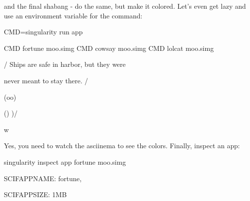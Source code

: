 \documentclass[letterpaper,10pt,english]{sphinxmanual}
\begin{document}
and the final shabang - do the same, but make it colored. Let’s even get
lazy and use an environment variable for the command:

%
\begin{sphinxVerbatim}[commandchars=\\\{\}]
CMD=\PYGZdq{}singularity run \PYGZhy{}\PYGZhy{}app\PYGZdq{}

\PYGZdl{}CMD fortune moo.simg \textbar{} \PYGZdl{}CMD cowsay moo.simg \textbar{} \PYGZdl{}CMD lolcat moo.simg

 \PYGZus{}\PYGZus{}\PYGZus{}\PYGZus{}\PYGZus{}\PYGZus{}\PYGZus{}\PYGZus{}\PYGZus{}\PYGZus{}\PYGZus{}\PYGZus{}\PYGZus{}\PYGZus{}\PYGZus{}\PYGZus{}\PYGZus{}\PYGZus{}\PYGZus{}\PYGZus{}\PYGZus{}\PYGZus{}\PYGZus{}\PYGZus{}\PYGZus{}\PYGZus{}\PYGZus{}\PYGZus{}\PYGZus{}\PYGZus{}\PYGZus{}\PYGZus{}\PYGZus{}\PYGZus{}\PYGZus{}\PYGZus{}\PYGZus{}\PYGZus{}\PYGZus{}\PYGZus{}\PYGZus{}

/ Ships are safe in harbor, but they were \PYGZbs{}

\PYGZbs{} never meant to stay there.              /

 \PYGZhy{}\PYGZhy{}\PYGZhy{}\PYGZhy{}\PYGZhy{}\PYGZhy{}\PYGZhy{}\PYGZhy{}\PYGZhy{}\PYGZhy{}\PYGZhy{}\PYGZhy{}\PYGZhy{}\PYGZhy{}\PYGZhy{}\PYGZhy{}\PYGZhy{}\PYGZhy{}\PYGZhy{}\PYGZhy{}\PYGZhy{}\PYGZhy{}\PYGZhy{}\PYGZhy{}\PYGZhy{}\PYGZhy{}\PYGZhy{}\PYGZhy{}\PYGZhy{}\PYGZhy{}\PYGZhy{}\PYGZhy{}\PYGZhy{}\PYGZhy{}\PYGZhy{}\PYGZhy{}\PYGZhy{}\PYGZhy{}\PYGZhy{}\PYGZhy{}\PYGZhy{}

        \PYGZbs{}   \PYGZca{}\PYGZus{}\PYGZus{}\PYGZca{}

         \PYGZbs{}  (oo)\PYGZbs{}\PYGZus{}\PYGZus{}\PYGZus{}\PYGZus{}\PYGZus{}\PYGZus{}\PYGZus{}

            (\PYGZus{}\PYGZus{})\PYGZbs{}       )\PYGZbs{}/\PYGZbs{}

                \textbar{}\textbar{}\PYGZhy{}\PYGZhy{}\PYGZhy{}\PYGZhy{}w \textbar{}

                \textbar{}\textbar{}     \textbar{}\textbar{}
\end{sphinxVerbatim}

Yes, you need to watch the asciinema to see the colors. Finally, inspect
an app:

%
\begin{sphinxVerbatim}[commandchars=\\\{\}]
singularity inspect \PYGZhy{}\PYGZhy{}app fortune moo.simg

\PYGZob{}

    \PYGZdq{}SCIF\PYGZus{}APP\PYGZus{}NAME\PYGZdq{}: \PYGZdq{}fortune\PYGZdq{},

    \PYGZdq{}SCIF\PYGZus{}APP\PYGZus{}SIZE\PYGZdq{}: \PYGZdq{}1MB\PYGZdq{}

\PYGZcb{}
\end{sphinxVerbatim}
\end{document}
